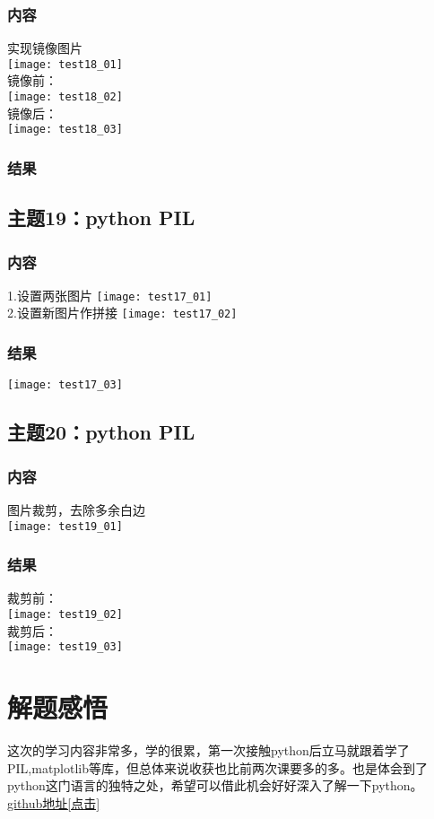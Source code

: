 \documentclass{article}
\begin{document}
\subsubsection{内容}
实现镜像图片\\
\texttt{[image: test18\_01]}\\
镜像前：\\
\texttt{[image: test18\_02]}\\
镜像后：\\
\texttt{[image: test18\_03]}\\
\subsubsection{结果}  
\vspace{1cm}
\subsection{主题19：python PIL}  
\subsubsection{内容}
1.设置两张图片
\texttt{[image: test17\_01]}\\
2.设置新图片作拼接
\texttt{[image: test17\_02]}\\
\subsubsection{结果}  
\texttt{[image: test17\_03]}\\
\vspace{1cm}
\subsection{主题20：python PIL}  
\subsubsection{内容}
图片裁剪，去除多余白边\\
\texttt{[image: test19\_01]}\\
\subsubsection{结果}  
裁剪前：\\
\texttt{[image: test19\_02]}\\
裁剪后：\\
\texttt{[image: test19\_03]}\\
\vspace{1cm}
\newpage
\thispagestyle{empty}
\section{解题感悟}  
这次的学习内容非常多，学的很累，第一次接触python后立马就跟着学了PIL,matplotlib等库，但总体来说收获也比前两次课要多的多。也是体会到了python这门语言的独特之处，希望可以借此机会好好深入了解一下python。\\
\href{https://github.com/coff-sug/system_development.git}{github地址[点击]}
\end{document}
